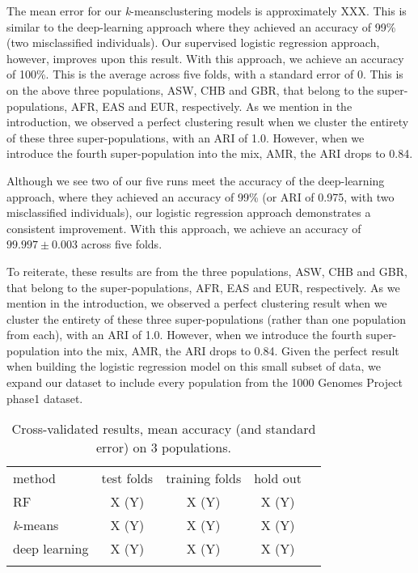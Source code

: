 \documentclass{llncs}
\newcommand{\kMeans}{\textit{k}-means}
\begin{document}
{The mean error for our \kMeans clustering models is approximately XXX. This is similar to the deep-learning approach
where they achieved an accuracy of 99\% (two misclassified individuals). Our supervised logistic regression approach,
however, improves upon this result.  With this approach, we achieve an accuracy of 100\%. This is the average across
five folds, with a standard error of 0. This is on the above three populations, ASW, CHB and GBR, that belong to the
super-populations, AFR, EAS and EUR, respectively.  As we mention in the introduction, we observed a perfect clustering
result when we cluster the entirety of these three super-populations, with an ARI of 1.0. However, when we introduce the
fourth super-population into the mix, AMR, the ARI drops to 0.84.

Although we see two of our five runs meet the accuracy of the deep-learning approach, where they achieved an accuracy of
99\% (or ARI of 0.975, with two misclassified individuals), our logistic regression approach demonstrates a consistent
improvement.  With this approach, we achieve an accuracy of \(99.997 \pm 0.003\) across five folds.

To reiterate, these results are from the three populations, ASW, CHB and GBR, that belong to the super-populations, AFR,
EAS and EUR, respectively.  As we mention in the introduction, we observed a perfect clustering result when we cluster
the entirety of these three super-populations (rather than one population from each), with an ARI of 1.0. However, when
we introduce the fourth super-population into the mix, AMR, the ARI drops to 0.84.  Given the perfect result when building
the logistic regression model on this small subset of data, we expand our dataset to include every population from the
1000 Genomes Project phase1 dataset.


\begin{table}
\caption{Cross-validated results, mean accuracy (and standard error) on 3 populations.}
\begin{center}
\renewcommand{\arraystretch}{1.4}
\setlength\tabcolsep{3pt}
\begin{tabular}{lcccc}
\hline\noalign{\smallskip}
method  & test folds & training folds & hold out \\
RF  & X (Y) & X (Y) & X (Y) \\
\kMeans & X (Y) & X (Y) & X (Y) \\
deep learning & X (Y) & X (Y) & X (Y) \\
\noalign{\smallskip}
\hline
\end{tabular}
\end{center}
\end{table}

}
\end{document}
